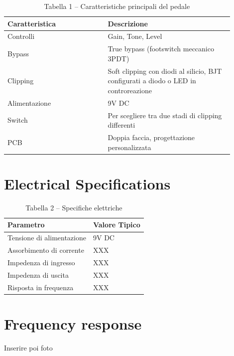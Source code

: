 \documentclass[a4paper,11pt]{article}
\begin{document}
\begin{table}[h!]
    \centering
    \begin{tabular}{|p{0.4\linewidth}|p{0.5\linewidth}|}
        \hline
        \textbf{Caratteristica} & \textbf{Descrizione} \\
        \hline
        Controlli & Gain, Tone, Level \\
        \hline
        Bypass & True bypass (footswitch meccanico 3PDT) \\
        \hline
        Clipping & Soft clipping con diodi al silicio, BJT configurati a diodo o LED in controreazione \\
        \hline
        Alimentazione & 9V DC \\
        \hline
        Switch & Per scegliere tra due stadi di clipping differenti \\
        \hline
        PCB & Doppia faccia, progettazione personalizzata \\
        \hline
    \end{tabular}
    \caption*{Tabella 1 – Caratteristiche principali del pedale}
\end{table}

\section{Electrical Specifications}

\begin{table}[H]
    \centering
    \begin{tabular}{|l|l|}
        \hline
        \textbf{Parametro} & \textbf{Valore Tipico} \\
        \hline
        Tensione di alimentazione & 9V DC \\
        \hline
        Assorbimento di corrente & XXX \\
        \hline
        Impedenza di ingresso & XXX \\
        \hline
        Impedenza di uscita & XXX \\
        \hline
        Risposta in frequenza & XXX \\
        \hline
    \end{tabular}
    \caption*{Tabella 2 – Specifiche elettriche}
\end{table}

\section{Frequency response}
Inserire poi foto
\end{document}

